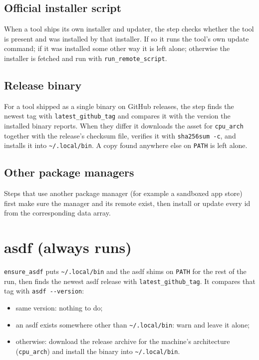 \documentclass[11pt,a4paper]{article}
\newcommand{\cmd}[1]{\texttt{#1}}
\begin{document}
\subsection{Official installer script}
When a tool ships its own installer and updater, the step checks whether the tool
is present and was installed by that installer. If so it runs the tool's own update
command; if it was installed some other way it is left alone; otherwise the installer
is fetched and run with \cmd{run\_remote\_script}.

\subsection{Release binary}
For a tool shipped as a single binary on GitHub releases, the step finds the newest tag
with \cmd{latest\_github\_tag} and compares it with the version the installed binary
reports. When they differ it downloads the asset for \cmd{cpu\_arch} together with the
release's checksum file, verifies it with \cmd{sha256sum -c}, and installs it into
\cmd{\textasciitilde/.local/bin}. A copy found anywhere else on \cmd{PATH} is left alone.

\subsection{Other package managers}
Steps that use another package manager (for example a sandboxed app store) first
make sure the manager and its remote exist, then install or update every id from
the corresponding data array.

\section{asdf (always runs)}
\cmd{ensure\_asdf} puts \cmd{\textasciitilde/.local/bin} and the asdf shims on \cmd{PATH} for the rest
of the run, then finds the newest asdf release with \cmd{latest\_github\_tag}. It compares that tag with \cmd{asdf -{}-version}:

\begin{itemize}
\item same version: nothing to do;
\item an asdf exists somewhere other than \cmd{\textasciitilde/.local/bin}: warn and leave it alone;
\item otherwise: download the release archive for the machine's architecture
  (\cmd{cpu\_arch}) and install the binary into \cmd{\textasciitilde/.local/bin}.
\end{itemize}
\end{document}
